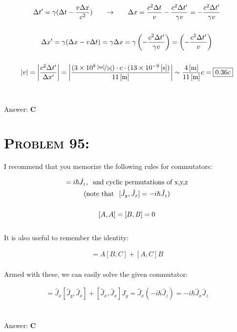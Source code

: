 \documentclass{article}
\providecommand{\e}[1]{\ensuremath{\times 10^{#1}}}
\begin{document}
\begin{gather}
\Delta t' = \gamma (\Delta t - \frac{v \Delta x}{c^{2}} )\hspace{.25in} \rightarrow \hspace{.25in} \Delta x =   \frac{c^2 \Delta t }{v} - \frac{c^2 \Delta t' }{\gamma v}\nonumber = - \frac{c^2 \Delta t'}{\gamma v }\\
\nonumber\\
\Delta x' = \gamma (\Delta x - v \Delta t)  = \gamma \Delta x = \gamma \left(  - \frac{c^2\Delta t' }{\gamma v}  \right) = \left(  - \frac{c^2\Delta t' }{ v}  \right)\nonumber\\
\nonumber\\
|v| = \left|  \frac{c^{2}\Delta t'}{\Delta x'}   \right| = \left|  \frac{(\unitfrac[3\e{8}]{[m]}{[s]})\cdot c \cdot (\unit[13\e{-9}]{[s]})}{\unit[11]{[m]} }  \right|  \sim \frac{\unit[4]{[m]}}{\unit[11]{[m]}}c = \boxed{0.36c}  \nonumber
\end{gather}
\\\\
Answer: \textbf{\textcolor{ProcessBlue}C}\\


\section{\textsc{Problem 95:}} I recommend that you memorize the following rules for commutators:

\begin{gather}
[\hat{J}_{x}, \hat{J}_{y}] = i \hbar \hat{J}_{z} \text{,} \hspace{.1in} \text{and cyclic permutations of x,y,z}\\
(\text{note that} \hspace{.1in} [\hat{J}_{y}, \hat{J}_{x}] = - i \hbar \hat{J}_{z}) \nonumber\\
\nonumber\\
[A, A] = [B, B] = 0
\end{gather}
\\
It is also useful to remember the identity:

\begin{align}
[AB, C] = A[B, C] +  [A, C] B
\end{align}
\\
Armed with these, we can easily solve the given commutator:

\begin{gather}
[\hat{J}_{x}\hat{J}_{y}, \hat{J}_{x}] = \hat{J}_{x}[\hat{J}_{y}, \hat{J}_{x}] +  [\hat{J}_{x}, \hat{J}_{x}] \hat{J}_{y} = \hat{J}_{x} (-i \hbar \hat{J}_{z}) = \boxed{-i \hbar \hat{J}_{x} \hat{J}_{z}}\nonumber
\end{gather}
\\\\
Answer: \textbf{\textcolor{ProcessBlue}C}\\
\end{document}
